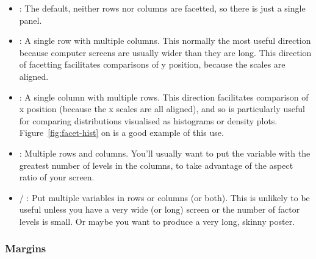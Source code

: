 \begin{itemize}
  \item {}: The default, neither rows nor columns are facetted, so there is just a single panel.



  \item {}: A single row with multiple columns.  This normally the most useful direction because computer screens are usually wider than they are long.  This direction of facetting facilitates comparisons of y position, because the scales are aligned.

  
  \item {}: A single column with multiple rows.  This direction facilitates comparison of x position (because the x scales are all aligned), and so is particularly useful for comparing distributions visualised as histograms or density plots.  Figure~\ref{fig:facet-hist} on \pageref{fig:facet-hist} is a good example of this use.


  \item {}: Multiple rows and columns.  You'll usually want to put the variable with the greatest number of levels in the columns, to take advantage of the aspect ratio of your screen.


  \item {} / :  Put multiple variables in rows or columns (or both). This is unlikely to be useful unless you have a very wide (or long) screen or the number of factor levels is small.  Or maybe you want to produce a very long, skinny poster.


\end{itemize}

\subsubsection{Margins}\label{sub:margins}

